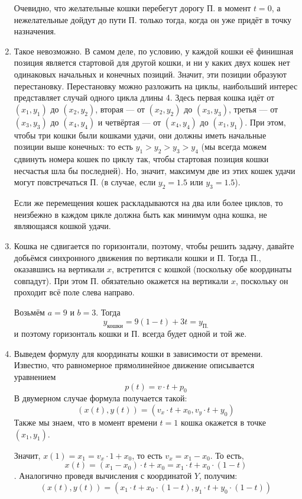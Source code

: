 \begin{enumerate}
Очевидно, что желательные кошки перебегут дорогу П. в момент $t=0$, а нежелательные дойдут до 
пути П. только тогда, когда он уже придёт в точку назначения.

\item Такое невозможно. В самом деле,
по условию, у каждой кошки её финишная позиция является стартовой для другой кошки, и
ни у каких двух кошек нет одинаковых начальных и конечных позиций.
Значит, эти позиции образуют перестановку. Перестановку можно разложить на циклы,
наибольший интерес представляет случай одного цикла длины 4. Здесь 
первая кошка идёт от $(x_1,y_1)$ до $(x_2,y_2)$, 
вторая --- от $(x_2,y_2)$ до $(x_3,y_3)$, третья --- от $(x_3,y_3)$ до $(x_4,y_4)$ и 
четвёртая --- от $(x_4,y_4)$ до $(x_1,y_1)$. 
При этом, чтобы три кошки были кошками удачи, 
они должны иметь начальные позиции выше конечных: то есть 
$y_1 > y_2 > y_3 > y_4$ (мы всегда можем сдвинуть номера кошек по циклу так, 
чтобы стартовая позиция кошки несчастья шла бы последней). Но, значит, максимум две из этих
кошек удачи могут повстречаться П. (в случае, если $y_2 = 1.5$ или $y_3 = 1.5$). 

Если же перемещения кошек раскладываются на два или более циклов, то неизбежно в 
каждом цикле должна быть как минимум одна кошка, не являющаяся кошкой удачи.

\item Кошка не сдвигается по горизонтали, поэтому, чтобы решить задачу, давайте добьёмся 
синхронного движения по вертикали кошки и П. Тогда П., 
оказавшись на вертикали $x$, встретится с кошкой (поскольку обе 
координаты совпадут). При этом П. обязательно окажется на вертикали $x$, поскольку
он проходит всё поле слева направо.

Возьмём $a=9$ и $b=3$. Тогда $$y_{\textit{кошки}} = 9(1-t) + 3t = y_{\textit{П.}}$$
и поэтому горизонталь кошки и П. всегда будет одной и той же.

\item Выведем формулу для координаты кошки в зависимости от времени.
Известно, что равномерное прямолинейное движение описывается уравнением
$$p(t) = v\cdot t + p_0$$
В двумерном случае формула получается такой:
$$(x(t),y(t)) = (v_x\cdot t + x_0,v_y\cdot t + y_0)$$
Также мы знаем, что в момент времени $t=1$ кошка окажется в точке $(x_1,y_1)$.

Значит, $x(1) = x_1 = v_x \cdot 1 + x_0$, то есть $v_x = x_1 - x_0$.
То есть, $$x(t) = (x_1 - x_0) \cdot t + x_0 = x_1 \cdot t + x_0 \cdot (1-t)$$.
Аналогично проведя вычисления с координатой $Y$, получим:
$$(x(t),y(t)) = (x_1 \cdot t + x_0 \cdot (1-t), y_1 \cdot t + y_0 \cdot (1-t))$$

\end{enumerate}
